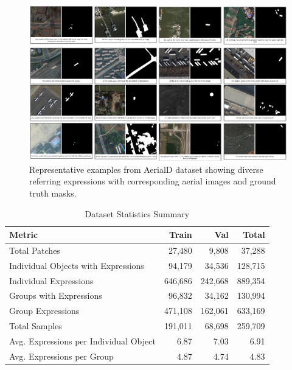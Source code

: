 \begin{figure}[H]
\centering
\includegraphics[width=\textwidth]{./Images/dataset.png}
\caption{Representative examples from AerialD dataset showing diverse referring expressions with corresponding aerial images and ground truth masks.}
\label{fig:dataset_examples}
\end{figure}

\begin{table}[H]
\centering
\caption{Dataset Statistics Summary}
\label{tab:dataset_stats}
\begin{tabular}{@{}lrrr@{}}
\toprule
\textbf{Metric} & \textbf{Train} & \textbf{Val} & \textbf{Total} \\
\midrule
Total Patches & 27,480 & 9,808 & 37,288 \\
Individual Objects with Expressions & 94,179 & 34,536 & 128,715 \\
Individual Expressions & 646,686 & 242,668 & 889,354 \\
Groups with Expressions & 96,832 & 34,162 & 130,994 \\
Group Expressions & 471,108 & 162,061 & 633,169 \\
Total Samples & 191,011 & 68,698 & 259,709 \\
Avg. Expressions per Individual Object & 6.87 & 7.03 & 6.91 \\
Avg. Expressions per Group & 4.87 & 4.74 & 4.83 \\
\bottomrule
\end{tabular}
\end{table}

